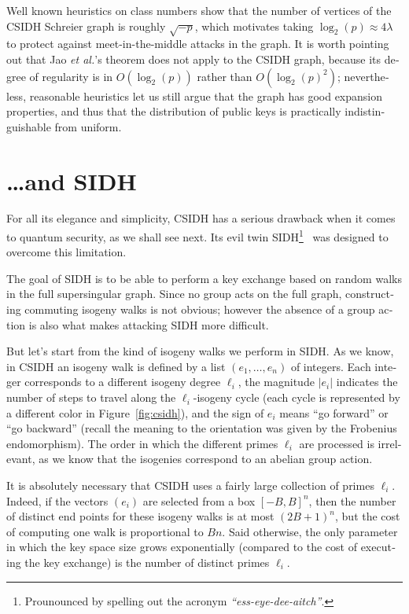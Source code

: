 \begin{otherlanguage}{english}
  Well known heuristics on class numbers show that the number of
  vertices of the CSIDH Schreier graph is roughly $\sqrt{-p}$, which
  motivates taking $\log_2(p)\approx 4\lambda$ to protect against
  meet-in-the-middle attacks in the graph.  It is worth pointing out
  that Jao \emph{et al.}'s theorem does not apply to the CSIDH graph,
  because its degree of regularity is in $O(\log_2(p))$ rather than
  $O(\log_2(p)^2)$; nevertheless, reasonable heuristics let us still
  argue that the graph has good expansion properties, and thus that
  the distribution of public keys is practically indistinguishable
  from uniform.
  
\section{\dots and SIDH}
For all its elegance and simplicity, CSIDH has a serious drawback when
it comes to quantum security, as we shall see next. Its evil twin
SIDH\footnote{Prounounced by spelling out the acronym
  \emph{``ess-eye-dee-aitch''}.}~\cite{jao+defeo2011,defeo+jao+plut12}
was designed to overcome this limitation.

The goal of SIDH is to be able to perform a key exchange based on
random walks in the full supersingular graph. Since no group acts on
the full graph, constructing commuting isogeny walks is not obvious;
however the absence of a group action is also what makes attacking
SIDH more difficult.

But let's start from the kind of isogeny walks we perform in SIDH. As
we know, in CSIDH an isogeny walk is defined by a list
$(e_1,\dots,e_n)$ of integers. Each integer corresponds to a different
isogeny degree $\ell_i$, the magnitude $|e_i|$ indicates the number of
steps to travel along the $\ell_i$-isogeny cycle (each cycle is
represented by a different color in Figure~\ref{fig:csidh}), and the
sign of $e_i$ means ``go forward'' or ``go backward'' (recall the
meaning to the orientation was given by the Frobenius endomorphism).
The order in which the different primes $\ell_i$ are processed is
irrelevant, as we know that the isogenies correspond to an abelian
group action.

It is absolutely necessary that CSIDH uses a fairly large collection
of primes $\ell_i$. Indeed, if the vectors $(e_i)$ are selected from a
box $[-B,B]^n$, then the number of distinct end points for these
isogeny walks is at most $(2B+1)^n$, but the cost of computing one
walk is proportional to $Bn$. Said otherwise, the only parameter in
which the key space size grows exponentially (compared to the cost of
executing the key exchange) is the number of distinct primes $\ell_i$.


\end{otherlanguage}
